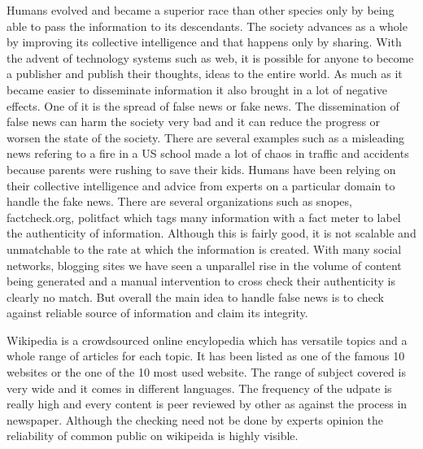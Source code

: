 \documentclass[a4paper, 11pt]{article}
\begin{document}




Humans evolved and became a superior race than other species only by being able to pass the information to its descendants. The society advances as a whole by improving its collective intelligence and that happens only by sharing. With the advent of technology systems such as web, it is possible for anyone to become a publisher and publish their thoughts, ideas to the entire world. As much as it became easier to disseminate information it also brought in a lot of negative effects. One of it is the spread of false news or fake news. The dissemination of false news can harm the society very bad and it can reduce the progress or worsen the state of the society. There are several examples such as a misleading news refering to a fire in a US school made a lot of chaos in traffic and accidents because parents were rushing to save their kids. Humans have been relying on their collective intelligence and advice from experts on a particular domain to handle the fake news. There are several organizations such as snopes, factcheck.org, politfact which tags many information with a fact meter to label the authenticity of information. Although this is fairly good, it is not scalable and unmatchable to the rate at which the information is created. With many social networks, blogging sites we have seen a unparallel rise in the volume of content being generated and a manual intervention to cross check their authenticity is clearly no match. But overall the main idea to handle false news is to check against reliable source of information and claim its integrity.

Wikipedia is a crowdsourced online encylopedia which has versatile topics and a whole range of articles for each topic. It has been listed as one of the famous 10 websites or the one of the 10 most used website. The range of subject covered is very wide and it comes in different languages. The frequency of the udpate is really high and every content is peer reviewed by other as against the process in newspaper. Although the checking need not be done by experts opinion the reliability of common public on wikipeida is highly visible. 
\end{document}
